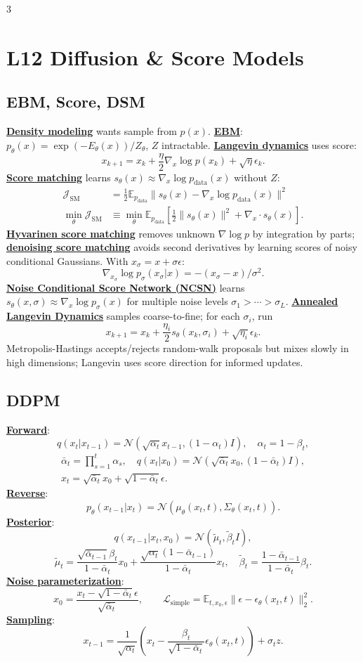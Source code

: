 \documentclass{article}
\numberwithin{equation}{subsection}
\newcommand{\lowterm}[1]{\textbf{\underline{#1}}}
\newcommand{\E}{\mathbb{E}}
\newcommand{\N}{\mathcal{N}}
\begin{document}
\begin{multicols*}{3}
\section{L12 Diffusion \& Score Models}
\subsection{EBM, Score, DSM}
\lowterm{Density modeling} wants sample from $p(x)$. \lowterm{EBM}: $p_\theta(x)=\exp(-E_\theta(x))/Z_\theta$, $Z$ intractable. \lowterm{Langevin dynamics} uses score:
\[
x_{k+1}=x_k+\frac{\eta}{2}\nabla_x\log p(x_k)+\sqrt{\eta}\epsilon_k.
\]
\lowterm{Score matching} learns $s_\theta(x)\approx\nabla_x\log p_{\text{data}}(x)$ without $Z$:
\[
\begin{aligned}
\mathcal J_{\mathrm{SM}}
&=\frac12\E_{p_{\text{data}}}\|s_\theta(x)-\nabla_x\log p_{\text{data}}(x)\|^2\\
\min_\theta\mathcal J_{\mathrm{SM}}
&\equiv \min_\theta\E_{p_{\text{data}}}\left[\frac12\|s_\theta(x)\|^2+\nabla_x\cdot s_\theta(x)\right].
\end{aligned}
\]
\lowterm{Hyvarinen score matching} removes unknown $\nabla\log p$ by integration by parts; \lowterm{denoising score matching} avoids second derivatives by learning scores of noisy conditional Gaussians. With $x_\sigma=x+\sigma\epsilon$:
\[
\nabla_{x_\sigma}\log p_\sigma(x_\sigma|x)=-(x_\sigma-x)/\sigma^2.
\]
\lowterm{Noise Conditional Score Network (NCSN)} learns $s_\theta(x,\sigma)\approx\nabla_x\log p_\sigma(x)$ for multiple noise levels $\sigma_1>\cdots>\sigma_L$. \lowterm{Annealed Langevin Dynamics} samples coarse-to-fine; for each $\sigma_i$, run
\[
x_{k+1}=x_k+\frac{\eta_i}{2}s_\theta(x_k,\sigma_i)+\sqrt{\eta_i}\epsilon_k .
\]
Metropolis-Hastings accepts/rejects random-walk proposals but mixes slowly in high dimensions; Langevin uses score direction for informed updates.

\subsection{DDPM}
\lowterm{Forward}:
\[
q(x_t|x_{t-1})=\N(\sqrt{\alpha_t}x_{t-1},(1-\alpha_t)I),\quad \alpha_t=1-\beta_t,
\]
\[
\begin{gathered}
\bar\alpha_t=\prod_{s=1}^t\alpha_s,\quad
q(x_t|x_0)=\N(\sqrt{\bar\alpha_t}x_0,(1-\bar\alpha_t)I),\\
x_t=\sqrt{\bar\alpha_t}x_0+\sqrt{1-\bar\alpha_t}\epsilon.
\end{gathered}
\]
\lowterm{Reverse}:
\[
p_\theta(x_{t-1}|x_t)=\N(\mu_\theta(x_t,t),\Sigma_\theta(x_t,t)).
\]
\lowterm{Posterior}:
\[
q(x_{t-1}|x_t,x_0)=\N(\tilde\mu_t,\tilde\beta_tI),
\]
\[
\tilde\mu_t=\frac{\sqrt{\bar\alpha_{t-1}}\beta_t}{1-\bar\alpha_t}x_0+
\frac{\sqrt{\alpha_t}(1-\bar\alpha_{t-1})}{1-\bar\alpha_t}x_t,\quad
\tilde\beta_t=\frac{1-\bar\alpha_{t-1}}{1-\bar\alpha_t}\beta_t.
\]
\lowterm{Noise parameterization}:
\[
x_0=\frac{x_t-\sqrt{1-\bar\alpha_t}\epsilon}{\sqrt{\bar\alpha_t}},
\qquad
\mathcal L_{\mathrm{simple}}=\E_{t,x_0,\epsilon}\|\epsilon-\epsilon_\theta(x_t,t)\|_2^2.
\]
\lowterm{Sampling}:
\[
x_{t-1}=\frac{1}{\sqrt{\alpha_t}}\left(x_t-\frac{\beta_t}{\sqrt{1-\bar\alpha_t}}\epsilon_\theta(x_t,t)\right)+\sigma_tz.
\]


\end{multicols*}
\end{document}
